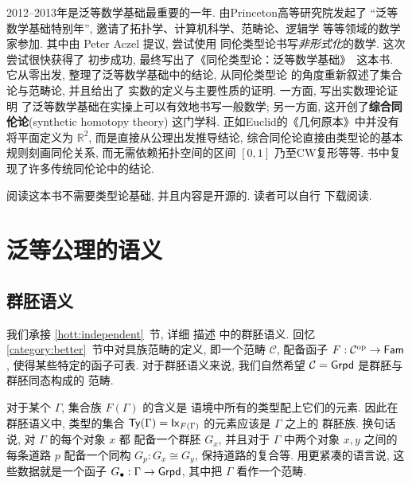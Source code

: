 2012--2013年是泛等数学基础最重要的一年. 由Princeton高等研究院发起了
“泛等数学基础特别年”, 邀请了拓扑学、计算机科学、范畴论、逻辑学
等等领域的数学家参加. 其中由 Peter Aczel 提议, 尝试使用
同伦类型论书写\emph{非形式化}的数学. 这次尝试很快获得了
初步成功, 最终写出了《同伦类型论：泛等数学基础》~\cite{ufp:2013:hottbook}这本书.
它从零出发, 整理了泛等数学基础中的结论, 从同伦类型论
的角度重新叙述了集合论与范畴论, 并且给出了
实数的定义与主要性质的证明. 一方面, 写出实数理论证明
了泛等数学基础在实操上可以有效地书写一般数学; 另一方面,
这开创了\textbf{综合同伦论}(synthetic homotopy theory)
这门学科. 正如Euclid的《几何原本》中并没有将平面定义为
\(\mathbb R^2\), 而是直接从公理出发推导结论,
综合同伦论直接由类型论的基本规则刻画同伦关系,
而无需依赖拓扑空间的区间 \([0,1]\) 乃至CW复形等等.
书中复现了许多传统同伦论中的结论.

阅读这本书不需要类型论基础, 并且内容是开源的. 读者可以自行
下载阅读.

\section{泛等公理的语义}
\label{hott:semantics}

\subsection{群胚语义}
我们承接 \ref{hott:independent}~节, 详细
描述 \cite{hofmann:1998:groupoid} 中的群胚语义. 
回忆 \ref{category:better}~节中对具族范畴的定义,
即一个范畴 \(\mathcal C\), 配备函子
\(F : \mathcal C^{\textrm{op}}\to \textnormal{\textsf{Fam}}\),
使得某些特定的函子可表. 对于群胚语义来说, 我们自然希望
\(\mathcal C = \textnormal{\textsf{Grpd}}\) 是群胚与群胚同态构成的
范畴.

对于某个 \(\Gamma\), 集合族 \(F(\Gamma)\) 的含义是
语境中所有的类型配上它们的元素. 因此在群胚语义中, 类型的集合
\(\textnormal{\textsf{Ty}}(\Gamma) = \textnormal{\textsf{Ix}}_{F(\Gamma)}\) 的元素应该是 \(\Gamma\) 之上的
群胚族. 换句话说, 对 \(\Gamma\) 的每个对象 \(x\) 都
配备一个群胚 \(G_x\), 并且对于 \(\Gamma\) 中两个对象
\(x,y\) 之间的每条道路 \(p\) 配备一个同构 \(G_p : G_x \cong G_y\),
保持道路的复合等. 用更紧凑的语言说, 这些数据就是一个函子
\(G_\bullet : \Gamma \to \textnormal{\textsf{Grpd}}\), 其中把 \(\Gamma\)
看作一个范畴.

